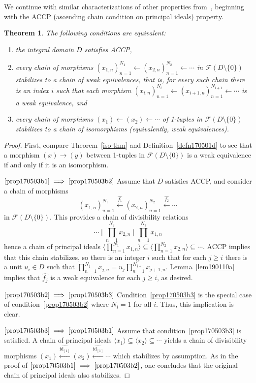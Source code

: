 \documentclass[reqno]{amsart}
\theoremstyle{plain}
\newtheorem{thm}[lem]{Theorem}
\theoremstyle{definition}
\newcommand{\cat}[1]{\mathcal{#1}}
\newcommand{\catf}{\cat{F}}
\newcommand{\id}{\operatorname{id}}
\newcommand{\from}{\leftarrow}
\newcommand{\xla}{\xleftarrow}
\renewcommand{\geq}{\geqslant}
\numberwithin{equation}{lem}
\begin{document}
We continue with 
similar characterizations of other properties from~\cite{AAZ},
beginning with
the ACCP (ascending chain condition on principal ideals)
property.

\begin{thm}\label{prop170503b}
The following conditions are equivalent:
\begin{enumerate}[\rm(i)]
\item\label{prop170503b1}
the 
integral
domain $D$ satisfies ACCP,
\item\label{prop170503b2}
every chain of morphisms $(x_{1,n})_{n=1}^{N_1} \leftarrow (x_{2,n})_{n=1}^{N_2} \leftarrow \cdots$ in 
$\catf(D\setminus\{0\})$ stabilizes to a chain of weak equivalences,
that is, for every such chain there is an index $i$ such that each morphism $(x_{i,n})_{n=1}^{N_i}\from(x_{i+1,n})_{n=1}^{N_{i+1}}\from\cdots$ is
a weak equivalence, and
\item\label{prop170503b3}
every chain of morphisms $(x_1) \leftarrow (x_2) \leftarrow \cdots$ of 1-tuples in 
$\catf(D\setminus\{0\})$ stabilizes to a chain of isomorphisms (equivalently, weak equivalences).
\end{enumerate}
\end{thm}


\begin{proof}
First, compare Theorem~\ref{iso-thm} and Definition~\ref{defn170501d} to see that a morphism 
$(x)\to(y)$ between 1-tuples in $\catf(D\setminus\{0\})$ is a weak equivalence if and only if it is an isomorphism. 

$\eqref{prop170503b1}\implies\eqref{prop170503b2}$
Assume that $D$ 
satisfies
ACCP, and consider a chain of morphisms 
$$(x_{1,n})_{n=1}^{N_1} \xla{\widehat{f_1}} (x_{2,n})_{n=1}^{N_2} \xla{\widehat{f_2}} \cdots$$ 
in 
$\catf(D\setminus\{0\})$.
This provides a chain of divisibility relations 
$$\textstyle\cdots \mid \prod_{n=1}^{N_2} x_{2,n} \mid  \prod_{n=1}^{N_1}x_{1,n}$$
hence a chain of principal ideals 
$\langle \prod_{n=1}^{N_1}x_{1,n}\rangle\subseteq\langle \prod_{n=1}^{N_2} x_{2,n}\rangle\subseteq\cdots$.
ACCP implies that
this chain stabilizes, so there is an integer $i$ such that
for each $j\geq i$ there is a unit $u_i\in D$ such that
$\prod_{n=1}^{N_j} x_{j,n}=u_j\prod_{n=1}^{N_{j+1}} x_{j+1,n}$.
Lemma~\ref{lem190110a}
implies that $\widehat{f_j}$ is a weak equivalence for each $j\geq i$, as desired.

$\eqref{prop170503b2}\implies\eqref{prop170503b3}$
Condition~\eqref{prop170503b3} is the special case of condition~\eqref{prop170503b2}
where $N_i=1$ for all $i$.
Thus, this implication is clear.

$\eqref{prop170503b3}\implies\eqref{prop170503b1}$
Assume that condition~\eqref{prop170503b3} is satisfied. A chain
of principal ideals $\langle x_1\rangle\subseteq\langle x_2\rangle\subseteq\cdots$
yields a chain of divisibility morphisms
$(x_1)\xla{\widehat{\id_{[1]}}} (x_2)\xla{\widehat{\id_{[1]}}}\cdots$
which stabilizes by assumption. 
As in the proof of $\eqref{prop170503b1}\implies\eqref{prop170503b2}$, 
one concludes that the original chain of principal ideals also stabilizes.
\end{proof}
\end{document}
